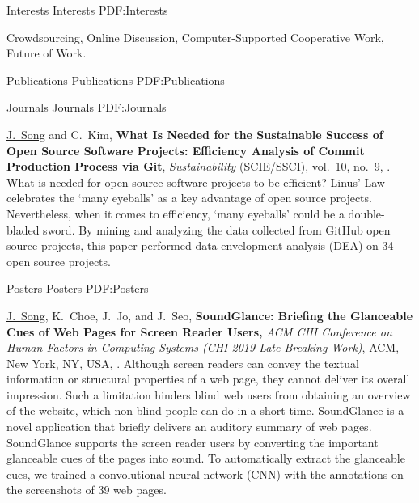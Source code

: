 \documentclass[letterpaper,MMMyyyy,nonstopmode]{template}
\begin{document}
\begin{Body}
\begin{Detail}
\end{Detail}

    
\BigGap
\Section
{Interests}
{Interests}
{PDF:Interests}

\Entry
Crowdsourcing,
Online Discussion,
Computer-Supported Cooperative Work,
Future of Work.


\BigGap
\Section
{Publications}
{Publications}
{PDF:Publications}

\SubSection
{Journals}
{Journals}
{PDF:Journals}

\begingroup
\renewcommand{\MaxNumberedItem}{[88]}

\BigGap
\NumberedItem{[1]}
\href{https://doi.org/10.3390/su10093001}
\underline{J.~Song} and C.~Kim,
\textbf{What Is Needed for the Sustainable Success of Open Source Software Projects: Efficiency Analysis of Commit Production Process via Git},
\textit{Sustainability} (SCIE/SSCI),
vol.~10,
no.~9,
.
\vspace{2mm}\newline
{\small{
  What is needed for open source software projects to be efficient? Linus' Law celebrates the `many eyeballs' as a key advantage of open source projects. 
  Nevertheless, when it comes to efficiency, `many eyeballs' could be a double-bladed sword. By mining and analyzing the data collected from GitHub open source projects, this paper performed data envelopment analysis (DEA) on 34 open source projects.
}}

\endgroup

\BigGap
\SubSection
{Posters}
{Posters}
{PDF:Posters}

\begingroup
\renewcommand{\MaxNumberedItem}{[88]}

\BigGap
\NumberedItem{[2]}
\href{https://doi.org/10.1145/3290607.3312865}
\underline{J.~Song}, K.~Choe, J.~Jo, and J.~Seo,
\textbf{SoundGlance: Briefing the Glanceable Cues of Web Pages for Screen Reader Users,}
\textit{ACM CHI Conference on Human Factors in Computing Systems (CHI 2019 Late Breaking Work)},
ACM, New York, NY, USA,
.
\vspace{2mm}\newline
{\small{
  Although screen readers can convey the textual information or structural properties of a web page, they cannot deliver its overall impression. Such a limitation hinders blind web users from obtaining an overview of the website, which non-blind people can do in a short time. 
  SoundGlance is a novel application that briefly delivers an auditory summary of web pages. SoundGlance supports the screen reader users by converting the important glanceable cues of the pages into sound.
  To automatically extract the glanceable cues, we trained a convolutional neural network (CNN) with the annotations on the screenshots of 39 web pages.
}}


\end{Body}
\end{document}
